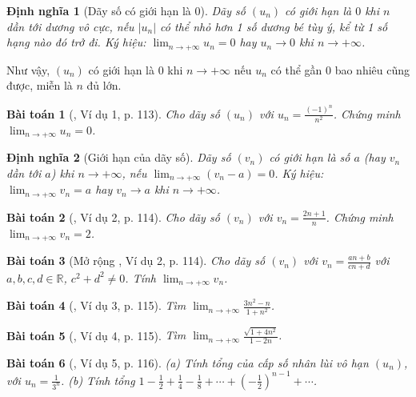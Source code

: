 \documentclass{article}
\numberwithin{equation}{section}
\newtheorem{baitoan}{Bài toán}
\newtheorem{dinhnghia}{Định nghĩa}[section]
\begin{document}
\begin{dinhnghia}[Dãy số có giới hạn là 0]
	Dãy số $(u_n)$ \emph{có giới hạn là $0$} khi $n$ dần tới dương vô cực, nếu $|u_n|$ có thể nhỏ hơn 1 số dương bé tùy ý, kể từ 1 số hạng nào đó trở đi. Ký hiệu: $\lim_{n\to+\infty} u_n = 0$ hay $u_n\to0$ khi $n\to+\infty$.
\end{dinhnghia}
Như vậy, $(u_n)$ có giới hạn là 0 khi $n\to+\infty$ nếu $u_n$ có thể gần 0 bao nhiêu cũng được, miễn là $n$ đủ lớn.

\begin{baitoan}[\cite{SGK_Toan_11_dai_so_giai_tich_co_ban}, Ví dụ 1, p. 113]
	Cho dãy số $(u_n)$ với $u_n = \frac{(-1)^n}{n^2}$. Chứng minh $\lim_{n\to+\infty} u_n = 0$.
\end{baitoan}

\begin{dinhnghia}[Giới hạn của dãy số]
	Dãy số $(v_n)$ có \emph{giới hạn} là số $a$ (hay $v_n$ dần tới $a$) khi $n\to+\infty$, nếu $\lim_{n\to+\infty} (v_n - a) = 0$. Ký hiệu: $\lim_{n\to+\infty} v_n = a$ hay $v_n\to a$ khi $n\to+\infty$.
\end{dinhnghia}

\begin{baitoan}[\cite{SGK_Toan_11_dai_so_giai_tich_co_ban}, Ví dụ 2, p. 114]
	Cho dãy số $(v_n)$ với $v_n = \frac{2n + 1}{n}$. Chứng minh $\lim_{n\to+\infty} v_n = 2$.
\end{baitoan}

\begin{baitoan}[Mở rộng \cite{SGK_Toan_11_dai_so_giai_tich_co_ban}, Ví dụ 2, p. 114]
	Cho dãy số $(v_n)$ với $v_n = \frac{an + b}{cn + d}$ với $a,b,c,d\in\mathbb{R}$, $c^2 + d^2\ne0$. Tính $\lim_{n\to+\infty} v_n$.
\end{baitoan}

\begin{baitoan}[\cite{SGK_Toan_11_dai_so_giai_tich_co_ban}, Ví dụ 3, p. 115]
	Tìm $\lim_{n\to+\infty} \frac{3n^2 - n}{1 + n^2}$.
\end{baitoan}

\begin{baitoan}[\cite{SGK_Toan_11_dai_so_giai_tich_co_ban}, Ví dụ 4, p. 115]
	Tìm $\lim_{n\to+\infty} \frac{\sqrt{1 + 4n^2}}{1 - 2n}$.
\end{baitoan}

\begin{baitoan}[\cite{SGK_Toan_11_dai_so_giai_tich_co_ban}, Ví dụ 5, p. 116]
	(a) Tính tổng của cấp số nhân lùi vô hạn $(u_n)$, với $u_n = \frac{1}{3^n}$. (b) Tính tổng $1 - \frac{1}{2} + \frac{1}{4} - \frac{1}{8} + \cdots + \left(-\frac{1}{2}\right)^{n-1} + \cdots$.
\end{baitoan}
\end{document}
